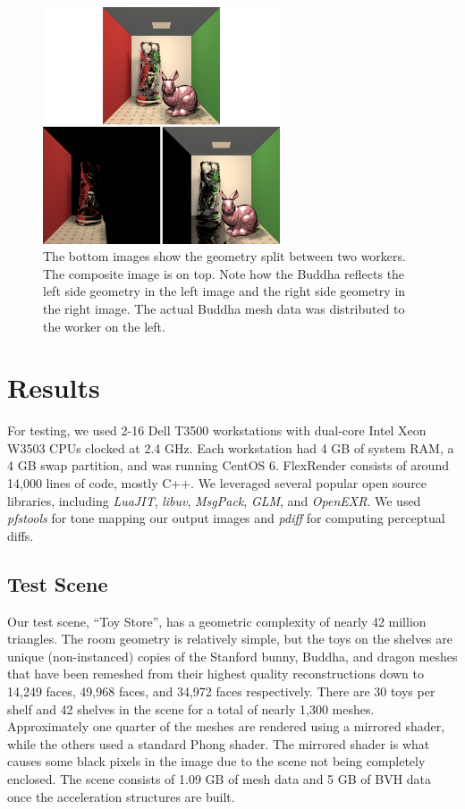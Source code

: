 \documentclass[a4paper,twoside]{article}
\begin{document}
\begin{figure}[h!]
    \centering
    \includegraphics[width=70mm]{images/linearity.png}
    \caption{The bottom images show the geometry split between two workers. The composite image is on top. Note how the Buddha reflects the left side geometry in the left image and the right side geometry in the right image. The actual Buddha mesh data was distributed to the worker on the left.}
    \label{fig:linearity}
\end{figure}

\section{Results}
\label{results}

For testing, we used 2-16 Dell T3500 workstations with dual-core Intel Xeon
W3503 CPUs clocked at 2.4 GHz. Each workstation had 4 GB of system RAM, a 4 GB
swap partition, and was running CentOS 6. FlexRender consists of around 14,000
lines of code, mostly C++. We leveraged several popular open source libraries,
including \emph{LuaJIT}, \emph{libuv}, \emph{MsgPack}, \emph{GLM}, and
\emph{OpenEXR}. We used \emph{pfstools} for tone mapping our output images and
\emph{pdiff} for computing perceptual diffs.

\subsection{Test Scene}
\label{toystore}

Our test scene, ``Toy Store'', has a geometric complexity of nearly 42 million
triangles. The room geometry is relatively simple, but the toys on the shelves
are unique (non-instanced) copies of the Stanford bunny, Buddha, and dragon
meshes that have been remeshed from their highest quality reconstructions down
to 14,249 faces, 49,968 faces, and 34,972 faces respectively. There are 30 toys
per shelf and 42 shelves in the scene for a total of nearly 1,300 meshes.
Approximately one quarter of the meshes are rendered using a mirrored shader,
while the others used a standard Phong shader. The mirrored shader is what causes
some black pixels in the image due to the scene not being completely enclosed.
The scene consists of 1.09 GB of mesh data and 5 GB of BVH data once the
acceleration structures are built.
\end{document}
